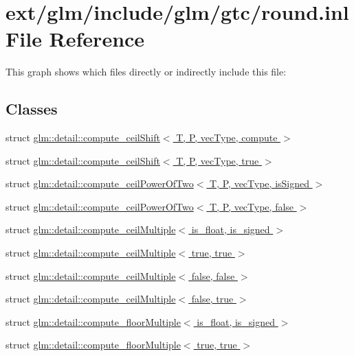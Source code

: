 \hypertarget{round_8inl}{\section{ext/glm/include/glm/gtc/round.inl File Reference}
\label{round_8inl}
}
This graph shows which files directly or indirectly include this file\-:
\subsection*{Classes}
\begin{DoxyCompactItemize}
\item 
struct \hyperlink{structglm_1_1detail_1_1compute__ceil_shift}{glm\-::detail\-::compute\-\_\-ceil\-Shift$<$ T, P, vec\-Type, compute $>$}
\item 
struct \hyperlink{structglm_1_1detail_1_1compute__ceil_shift_3_01_t_00_01_p_00_01vec_type_00_01true_01_4}{glm\-::detail\-::compute\-\_\-ceil\-Shift$<$ T, P, vec\-Type, true $>$}
\item 
struct \hyperlink{structglm_1_1detail_1_1compute__ceil_power_of_two}{glm\-::detail\-::compute\-\_\-ceil\-Power\-Of\-Two$<$ T, P, vec\-Type, is\-Signed $>$}
\item 
struct \hyperlink{structglm_1_1detail_1_1compute__ceil_power_of_two_3_01_t_00_01_p_00_01vec_type_00_01false_01_4}{glm\-::detail\-::compute\-\_\-ceil\-Power\-Of\-Two$<$ T, P, vec\-Type, false $>$}
\item 
struct \hyperlink{structglm_1_1detail_1_1compute__ceil_multiple}{glm\-::detail\-::compute\-\_\-ceil\-Multiple$<$ is\-\_\-float, is\-\_\-signed $>$}
\item 
struct \hyperlink{structglm_1_1detail_1_1compute__ceil_multiple_3_01true_00_01true_01_4}{glm\-::detail\-::compute\-\_\-ceil\-Multiple$<$ true, true $>$}
\item 
struct \hyperlink{structglm_1_1detail_1_1compute__ceil_multiple_3_01false_00_01false_01_4}{glm\-::detail\-::compute\-\_\-ceil\-Multiple$<$ false, false $>$}
\item 
struct \hyperlink{structglm_1_1detail_1_1compute__ceil_multiple_3_01false_00_01true_01_4}{glm\-::detail\-::compute\-\_\-ceil\-Multiple$<$ false, true $>$}
\item 
struct \hyperlink{structglm_1_1detail_1_1compute__floor_multiple}{glm\-::detail\-::compute\-\_\-floor\-Multiple$<$ is\-\_\-float, is\-\_\-signed $>$}
\item 
struct \hyperlink{structglm_1_1detail_1_1compute__floor_multiple_3_01true_00_01true_01_4}{glm\-::detail\-::compute\-\_\-floor\-Multiple$<$ true, true $>$}

\end{DoxyCompactItemize}
